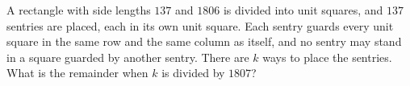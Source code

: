 A rectangle with side lengths $137$ and $1806$ is divided into unit squares, and $137$ sentries are placed, each in its own unit square. Each sentry guards every unit square in the same row and the same column as itself, and no sentry may stand in a square guarded by another sentry. There are $k$ ways to place the sentries. What is the remainder when $k$ is divided by $1807$?
